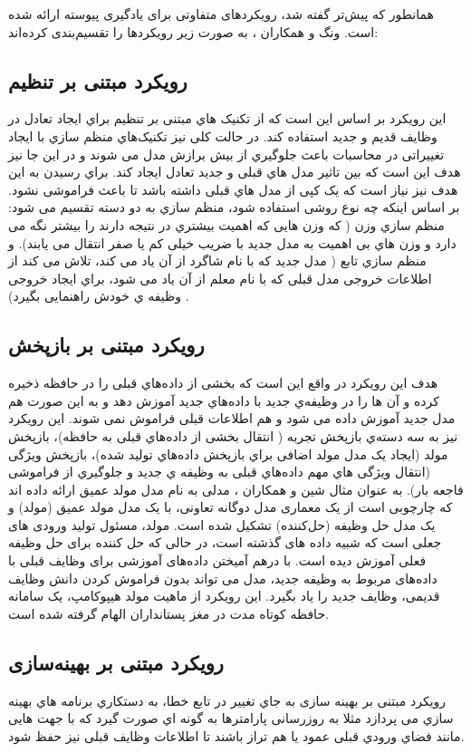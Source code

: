 همانطور که پیش‌تر گفته شد، رویکردهای متفاوتی برای یادگیری پیوسته ارائه شده است. ونگ و همکاران 
\cite{1}
، به صورت زیر رویکردها را تقسیم‌بندی کرده‌اند:
\subsection{رویکرد مبتنی بر تنظیم}
این رویکرد بر اساس این است که از تکنیک هاي مبتنی بر تنظیم
براي ایجاد تعادل در وظایف قدیم و جدید استفاده کند. در حالت کلی نیز تکنیک‌هاي منظم سازي با ایجاد تغییراتی در محاسبات باعث جلوگیري از بیش برازش مدل می شوند و در این جا نیز هدف این است که بین تاثیر مدل هاي قبلی و جدید تعادل ایجاد کند. براي رسیدن به این هدف نیز نیاز است که یک کپی از مدل هاي قبلی داشته باشد تا باعث فراموشی نشود. بر اساس اینکه چه نوع روشی استفاده شود، منظم سازي به دو دسته تقسیم می شود: منظم سازي وزن ( که وزن هایی که اهمیت بیشتري در نتیجه دارند را بیشتر نگه می دارد و وزن هاي بی اهمیت به مدل جدید با ضریب خیلی کم یا صفر انتقال می یابند). و منظم سازي تابع ( مدل جدید که با نام شاگرد از آن یاد می کند، تلاش می کند از اطلاعات خروجی مدل قبلی که با نام معلم از آن یاد می شود، براي ایجاد خروجی وظیفه ي خودش راهنمایی بگیرد) 
\cite{7,8}.
\subsection{رویکرد مبتنی بر بازپخش}
هدف این رویکرد در واقع این است که بخشی از داده‌هاي قبلی را در حافظه ذخیره کرده و آن ها را در وظیفه‌ي جدید با داده‌هاي جدید آموزش دهد و به این صورت هم مدل جدید آموزش داده می شود و هم اطلاعات قبلی فراموش نمی شوند. این رویکرد نیز به سه دسته‌ي بازپخش تجربه 
( انتقال بخشی از داده‌هاي قبلی به حافظه)، بازپخش مولد 
(ایجاد یک مدل مولد اضافی براي بازپخش داده‌هاي تولید شده)، بازپخش ویژگی 
(انتقال ویژگی هاي مهم داده‌هاي قبلی به وظیفه ي جدید و جلوگیري از فراموشی فاجعه بار). به عنوان مثال شین و همکاران 
\cite{9}
، مدلی به نام مدل مولد عمیق ارائه داده اند که چارچوبی است از یک معماری مدل دوگانه تعاونی، با یک مدل مولد عمیق (مولد) و یک مدل حل وظیفه (حل‌کننده) تشکیل شده است. مولد، مسئول تولید ورودی های جعلی است که شبیه داده های گذشته است، در حالی که حل کننده برای حل وظیفه فعلی آموزش دیده است.  با درهم آمیختن داده‌های آموزشی برای وظایف قبلی با داده‌های مربوط به وظیفه جدید، مدل می تواند بدون فراموش کردن دانش وظایف قدیمی، وظایف جدید را یاد بگیرد. این رویکرد از ماهیت مولد هیپوکامپ، یک سامانه حافظه کوتاه مدت در مغز پستانداران الهام گرفته شده است. 
\subsection{رویکرد مبتنی بر بهینه‌سازی}
رویکرد مبتنی بر بهینه سازی 
به جاي تغییر در تابع خطا، به دستکاري برنامه هاي بهینه سازي می پردازد مثلا به روزرسانی پارامتر‌ها
 به گونه اي صورت گیرد که با جهت هایی مانند فضاي ورودي قبلی عمود یا هم تراز باشند تا اطلاعات وظایف قبلی نیز حفظ شود. 
